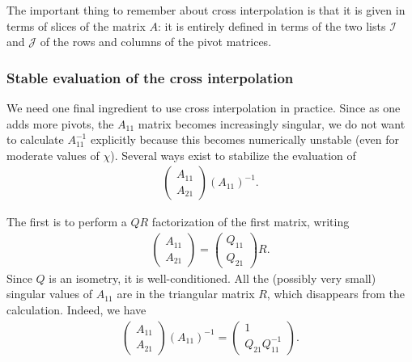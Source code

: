 \documentclass{SciPost}
\newcommand{\mI}{\mathcal{I}}
\newcommand{\mJ}{\mathcal{J}}
\begin{document}
The important thing to remember about cross interpolation is that it is given in terms
of slices of the matrix $A$: it is entirely defined in terms of the two lists
$\mI$ and $\mJ$ of the rows and columns of the pivot matrices.

\subsubsection{Stable evaluation of the cross interpolation}
We need one final ingredient to use cross interpolation in practice. Since as one adds more pivots, the $A_{11}$ matrix becomes increasingly singular, we do not want to
calculate $A_{11}^{-1}$ explicitly because this becomes numerically unstable (even for moderate values of $\chi$). Several ways exist to stabilize the evaluation of
\begin{align}
\begin{pmatrix}
A_{11} \\ A_{21} \end{pmatrix}
(A_{11})^{-1}.
\end{align}

The first is to perform a $QR$ factorization of the first matrix, writing
\begin{align}
\begin{pmatrix}
A_{11} \\ A_{21} \end{pmatrix}
= \begin{pmatrix}
Q_{11} \\ Q_{21} \end{pmatrix} R.
\end{align}
Since $Q$ is an isometry, it is well-conditioned. All the (possibly very small)
singular values of $A_{11}$ are in the triangular matrix $R$, which disappears from the calculation.
Indeed, we have
\begin{align}
\begin{pmatrix}
A_{11} \\ A_{21} \end{pmatrix}
(A_{11})^{-1} =
\begin{pmatrix}
1 \\ Q_{21}Q_{11}^{-1} \end{pmatrix}.
\end{align}
\end{document}
